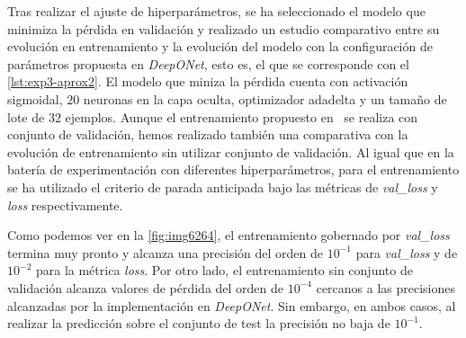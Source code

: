 Tras realizar el ajuste de hiperparámetros, se ha seleccionado el modelo que minimiza la pérdida en validación y realizado un estudio comparativo entre su evolución en entrenamiento y la evolución del modelo con la configuración de parámetros propuesta en \textit{DeepONet}, esto es, el que se corresponde con el \autoref{lst:exp3-aprox2}. El modelo que miniza la pérdida cuenta con activación sigmoidal, $20$ neuronas en la capa oculta, optimizador adadelta y un tamaño de lote de $32$ ejemplos. Aunque el entrenamiento propuesto en~\cite{lu2024deeponet} se realiza con conjunto de validación, hemos realizado también una comparativa con la evolución de entrenamiento sin utilizar conjunto de validación. Al igual que en la batería de experimentación con diferentes hiperparámetros, para el entrenamiento se ha utilizado el criterio de parada anticipada bajo las métricas de \textit{val\_loss} y \textit{loss} respectivamente.

Como podemos ver en la \autoref{fig:img6264}, el entrenamiento gobernado por \textit{val\_loss} termina muy pronto y alcanza una precisión del orden de $10^{-1}$ para \textit{val\_loss} y de $10^{-2}$ para la métrica \textit{loss}. Por otro lado, el entrenamiento sin conjunto de validación alcanza valores de pérdida del orden de $10^{-4}$ cercanos a las precisiones alcanzadas por la implementación en \textit{DeepONet}. Sin embargo, en ambos casos, al realizar la predicción sobre el conjunto de test la precisión no baja de $10^{-1}$. 




